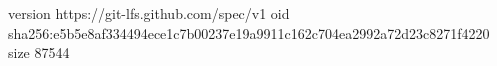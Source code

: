 version https://git-lfs.github.com/spec/v1
oid sha256:e5b5e8af334494ece1c7b00237e19a9911c162c704ea2992a72d23c8271f4220
size 87544
